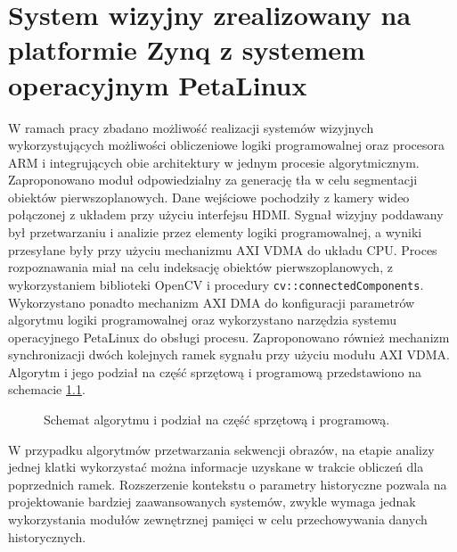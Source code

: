 \chapter{System wizyjny zrealizowany na platformie Zynq z systemem operacyjnym PetaLinux}
\label{cha:project}


W ramach pracy zbadano możliwość realizacji systemów wizyjnych wykorzystujących możliwości obliczeniowe logiki programowalnej oraz procesora ARM i integrujących obie architektury w jednym procesie algorytmicznym. Zaproponowano moduł odpowiedzialny za generację tła w celu segmentacji obiektów pierwszoplanowych. 
Dane wejściowe pochodziły z kamery wideo połączonej z układem przy użyciu interfejsu HDMI. Sygnał wizyjny poddawany był przetwarzaniu i analizie przez elementy logiki programowalnej, a wyniki przesyłane były przy użyciu mechanizmu AXI VDMA do układu CPU. Proces rozpoznawania miał na celu indeksację obiektów pierwszoplanowych, z wykorzystaniem biblioteki OpenCV i procedury \texttt{cv::connectedComponents}. Wykorzystano ponadto mechanizm AXI DMA do konfiguracji parametrów algorytmu logiki programowalnej oraz wykorzystano narzędzia systemu operacyjnego PetaLinux do obsługi procesu. Zaproponowano również mechanizm synchronizacji dwóch kolejnych ramek sygnału przy użyciu modułu AXI VDMA.
Algorytm i jego podział na część sprzętową i programową przedstawiono na schemacie \ref{fig:full-algo}.

\begin{figure}[h]
	\centering
	\def\svgwidth{\textwidth}
	
	\caption{Schemat algorytmu i podział na część sprzętową i programową.}
	\label{fig:full-algo}
\end{figure}

W przypadku algorytmów przetwarzania sekwencji obrazów, na etapie analizy jednej klatki wykorzystać można informacje uzyskane w trakcie obliczeń dla poprzednich ramek. 
Rozszerzenie kontekstu o parametry historyczne pozwala na projektowanie bardziej zaawansowanych systemów, zwykle wymaga jednak wykorzystania modułów zewnętrznej pamięci w celu przechowywania danych historycznych.

